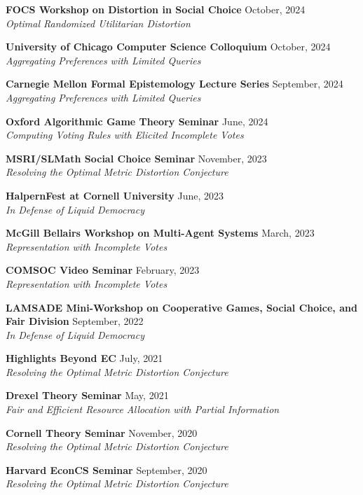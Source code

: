 \documentclass{article}
\newcommand{\talk}[3]{\textbf{#1} \hfill #2 \\\textit{#3}}
\begin{document}
\talk{FOCS Workshop on Distortion in Social Choice}{October, 2024}{Optimal Randomized Utilitarian Distortion}

\talk{University of Chicago Computer Science Colloquium}{October, 2024}{Aggregating Preferences with Limited Queries}

\talk{Carnegie Mellon Formal Epistemology Lecture Series}{September, 2024}{Aggregating Preferences with Limited Queries}

\talk{Oxford Algorithmic Game Theory Seminar}{June, 2024}{Computing Voting Rules with Elicited Incomplete Votes}

\talk{MSRI/SLMath Social Choice Seminar}{November, 2023}{Resolving the Optimal Metric Distortion Conjecture}

\talk{HalpernFest at Cornell University}{June, 2023}{In Defense of Liquid Democracy}

\talk{McGill Bellairs Workshop on Multi-Agent Systems}{March, 2023}{Representation with Incomplete Votes}

\talk{COMSOC Video Seminar}{February, 2023}{Representation with Incomplete Votes}

\talk{LAMSADE Mini-Workshop on Cooperative Games, Social Choice, and Fair Division}{September, 2022}{In Defense of Liquid Democracy}

\talk{Highlights Beyond EC}{July, 2021}{Resolving the Optimal Metric Distortion Conjecture}

\talk{Drexel Theory Seminar}{May, 2021}{Fair and Efficient Resource Allocation with Partial Information}

\talk{Cornell Theory Seminar}{November, 2020}{Resolving the Optimal Metric Distortion Conjecture}

\talk{Harvard EconCS Seminar}{September, 2020}{Resolving the Optimal Metric Distortion Conjecture}
\end{document}
